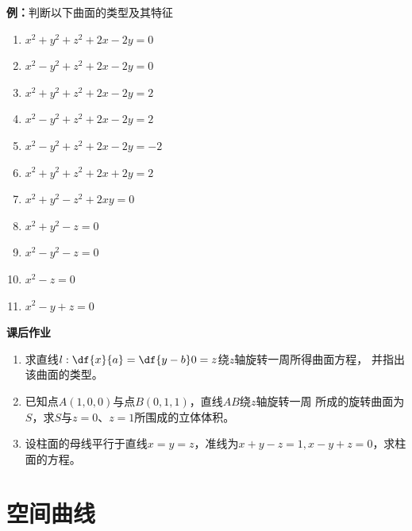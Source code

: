 {\bf 例：}判断以下曲面的类型及其特征
\begin{enumerate}[(1)]
  \setlength{\itemindent}{1cm}
  \item $x^2+y^2+z^2+2x-2y=0$
  \item $x^2-y^2+z^2+2x-2y=0$
  \item $x^2+y^2+z^2+2x-2y=2$
  \item $x^2-y^2+z^2+2x-2y=2$
  \item $x^2-y^2+z^2+2x-2y=-2$
  \item $x^2+y^2+z^2+2x+2y=2$
  \item $x^2+y^2-z^2+2xy=0$
  \item $x^2+y^2-z=0$
  \item $x^2-y^2-z=0$
  \item $x^2-z=0$
  \item $x^2-y+z=0$
\end{enumerate}

\begin{ext}
	{\bf 课后作业}
	\begin{enumerate}
	  \item 求直线$l:\df{x}{a}=\df{y-b}0=z$绕$z$轴旋转一周所得曲面方程，
	  并指出该曲面的类型。
	  \item 已知点$A(1,0,0)$与点$B(0,1,1)$，直线$AB$绕$z$轴旋转一周
	  所成的旋转曲面为$S$，求$S$与$z=0$、$z=1$所围成的立体体积。
	  \item 设柱面的母线平行于直线$x=y=z$，准线为$x+y-z=1,x-y+z=0$，求柱面的方程。
	\end{enumerate}
\end{ext}

\section{空间曲线}

